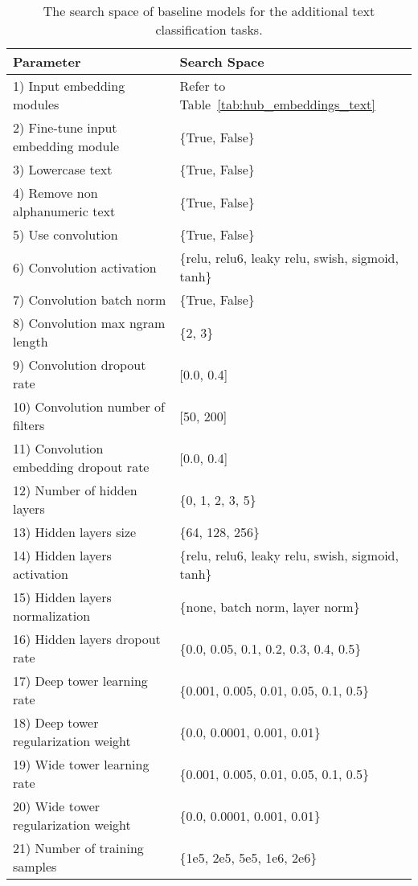 \documentclass{article}
\begin{document}
\begin{table*}[ht]
\centering
\begin{adjustbox}{max width=\textwidth}
\begin{tabular}{ll}
\toprule
\bf Parameter  & \bf Search Space \\
\midrule
1) Input embedding modules & Refer to Table~\ref{tab:hub_embeddings_text} \\
2) Fine-tune input embedding module & \{True, False\} \\
3) Lowercase text & \{True, False\} \\
4) Remove non alphanumeric text & \{True, False\} \\
5) Use convolution & \{True, False\} \\
6) Convolution activation & \{relu, relu6, leaky relu, swish, sigmoid, tanh\} \\
7) Convolution batch norm & \{True, False\} \\
8) Convolution max ngram length & \{2, 3\} \\
9) Convolution dropout rate & [0.0, 0.4] \\
10) Convolution number of filters & [50, 200]\\
11) Convolution embedding dropout rate & [0.0, 0.4] \\
12) Number of hidden layers & \{0, 1, 2, 3, 5\} \\
13) Hidden layers size & \{64, 128, 256\} \\
14) Hidden layers activation & \{relu, relu6, leaky relu, swish, sigmoid, tanh\} \\
15) Hidden layers normalization & \{none, batch norm, layer norm\} \\
16) Hidden layers dropout rate & \{0.0, 0.05, 0.1, 0.2, 0.3, 0.4, 0.5\} \\
17) Deep tower learning rate & \{0.001, 0.005, 0.01, 0.05, 0.1, 0.5\} \\
18) Deep tower regularization weight & \{0.0, 0.0001, 0.001, 0.01\} \\
19) Wide tower learning rate & \{0.001, 0.005, 0.01, 0.05, 0.1, 0.5\} \\
20) Wide tower regularization weight & \{0.0, 0.0001, 0.001, 0.01\} \\
21) Number of training samples & \{1e5, 2e5, 5e5, 1e6, 2e6\} \\
\bottomrule
\end{tabular}
\end{adjustbox}
\caption{The search space of baseline models for the additional text classification tasks.}
\label{tab:hub_ss}
\end{table*}
\end{document}
